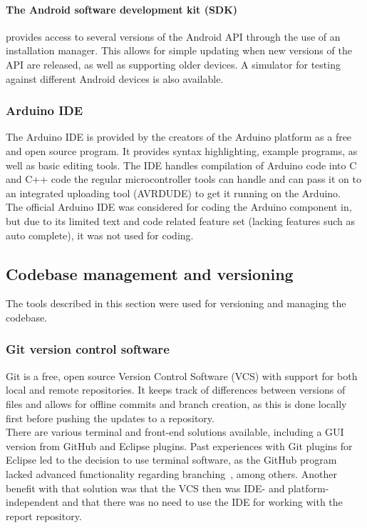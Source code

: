 \paragraph{The Android software development kit (SDK)} provides access to several versions of the Android API through the use of an installation manager. This allows for simple updating when new versions of the API are released, as well as supporting older devices. A simulator for testing against different Android devices is also available.

\subsubsection{Arduino IDE}
The Arduino IDE is provided by the creators of the Arduino platform as a free and open source program. It provides syntax highlighting, example programs, as well as basic editing tools. The IDE handles compilation of Arduino code into C and C++ code the regular microcontroller tools can handle and can pass it on to an integrated uploading tool (AVRDUDE) to get it running on the Arduino.\\
\newline
The official Arduino IDE was considered for coding the Arduino component in, but due to its limited text and code related feature set (lacking features such as auto complete), it was not used for coding.

\subsection{Codebase management and versioning}
The tools described in this section were used for versioning and managing the codebase.

\subsubsection{Git version control software}
Git is a free, open source Version Control Software (VCS) with support for both local and remote repositories. It keeps track of differences between versions of files and allows for offline commits and branch creation, as this is done locally first before pushing the updates to a repository.\\
\newline
There are various terminal and front-end solutions available, including a GUI version from GitHub and Eclipse plugins. Past experiences with Git plugins for Eclipse led to the decision to use terminal software, as the GitHub program lacked advanced functionality regarding branching~\cite{git-branch}, among others. Another benefit with that solution was that the VCS then was IDE- and platform-independent and that there was no need to use the IDE for working with the report repository.

